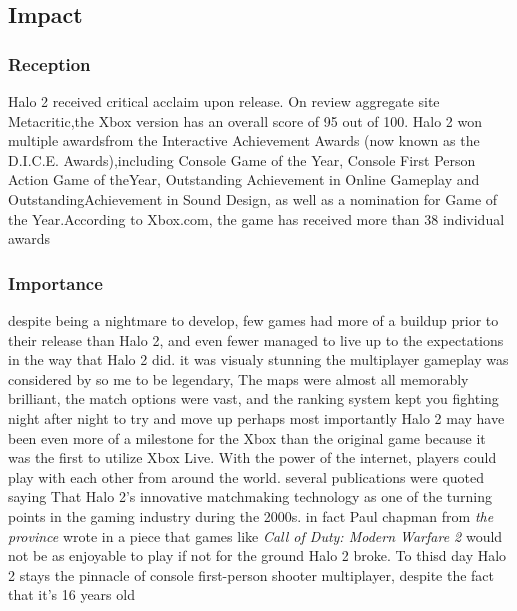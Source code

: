 \documentclass[a4paper,10pt]{book}
\begin{document}
 
 \subsection{Impact }
 
 \subsubsection{Reception }
 
          Halo 2 received critical acclaim upon release.  On review aggregate site Metacritic,the Xbox version has an overall score of 95 out of 100. 
          Halo 2 won multiple awardsfrom the Interactive Achievement Awards (now known as the D.I.C.E. Awards),including Console Game of the Year, Console First Person Action Game of theYear,
          Outstanding Achievement in Online Gameplay and OutstandingAchievement in Sound Design, as well as a nomination for Game of the Year.According to Xbox.com, the game has received more than 38 individual awards
         
 
 \subsubsection{Importance }
 
          despite being a nightmare to develop, few games had more of a buildup prior to their release than Halo 2, and even fewer managed to live up to the expectations in the way that Halo 2 did.
          it was visualy stunning the multiplayer gameplay was considered by so   me to be legendary, The maps were almost all memorably brilliant, the match options were vast, and the ranking system kept
          you fighting night after night to try and move up perhaps most importantly Halo 2 may have been even more of a milestone for the Xbox than the original game because it was the
          first to utilize Xbox Live. With the power of the internet, players could play with each other from around the world. several publications were quoted saying That
          Halo 2's innovative matchmaking technology as one of the turning points in the gaming industry during the 2000s. in fact Paul chapman from  \textit{the province } 
          wrote in a piece that games like  \textit{ Call of Duty: Modern Warfare 2 } would not be as enjoyable to play if not for the ground Halo 2 broke. To thisd day Halo 2 stays the pinnacle 
          of console first-person shooter multiplayer, despite the fact that it's 16 years old

         
 
\end{document}
